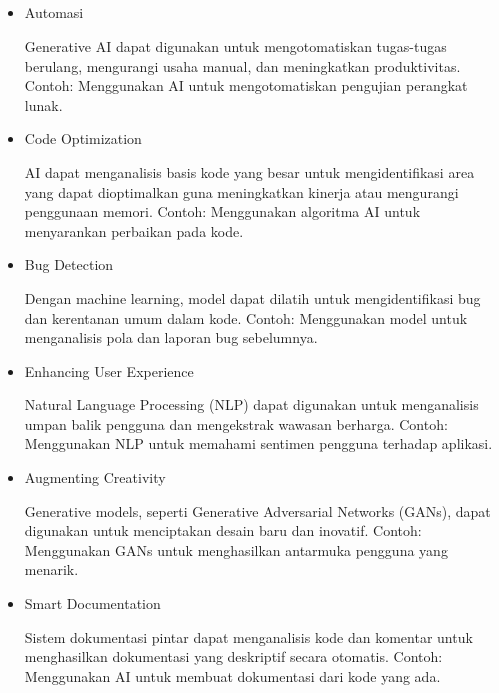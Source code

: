 \documentclass{article}
\begin{document}
\subsection{}
\begin{itemize}
    \item  Automasi

          Generative AI dapat digunakan untuk mengotomatiskan tugas-tugas berulang, mengurangi usaha manual, dan meningkatkan produktivitas. Contoh: Menggunakan AI untuk mengotomatiskan pengujian perangkat lunak.
    \item Code Optimization

          AI dapat menganalisis basis kode yang besar untuk mengidentifikasi area yang dapat dioptimalkan guna meningkatkan kinerja atau mengurangi penggunaan memori. Contoh: Menggunakan algoritma AI untuk menyarankan perbaikan pada kode.
    \item Bug Detection

          Dengan machine learning, model dapat dilatih untuk mengidentifikasi bug dan kerentanan umum dalam kode. Contoh: Menggunakan model untuk menganalisis pola dan laporan bug sebelumnya.
    \item Enhancing User Experience

          Natural Language Processing (NLP) dapat digunakan untuk menganalisis umpan balik pengguna dan mengekstrak wawasan berharga. Contoh: Menggunakan NLP untuk memahami sentimen pengguna terhadap aplikasi.
    \item Augmenting Creativity

          Generative models, seperti Generative Adversarial Networks (GANs), dapat digunakan untuk menciptakan desain baru dan inovatif. Contoh: Menggunakan GANs untuk menghasilkan antarmuka pengguna yang menarik.
    \item Smart Documentation

          Sistem dokumentasi pintar dapat menganalisis kode dan komentar untuk menghasilkan dokumentasi yang deskriptif secara otomatis. Contoh: Menggunakan AI untuk membuat dokumentasi dari kode yang ada.
\end{itemize}
\end{document}
